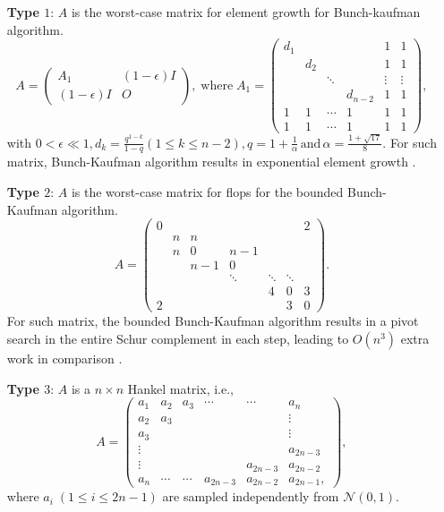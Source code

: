 \documentclass[11pt]{article}
\begin{document}
\begin{itemize}
\item[{\bf Type $1$}:] $A$ is the worst-case matrix for element growth for Bunch-kaufman algorithm.
\[ A = \left(
\begin{array}{cc}
A_1 & (1 - \epsilon) I \\
(1 - \epsilon) I & O 
\end{array}
\right), \; \mbox{where} \; A_1 = \left(
\begin{array}{cccccc}
d_1 &  &  &  & 1 & 1 \\
& d_2 &  &  & 1 & 1 \\
&  & \ddots &  & \vdots & \vdots \\
&  &  & d_{n-2} & 1 & 1 \\
1 & 1 & \cdots & 1 & 1 & 1 \\
1 & 1 & \cdots & 1 & 1 & 1 
\end{array}
\right), \]
with ${\displaystyle 0 < \epsilon \ll 1, d_k = \frac{q^{1-k}}{1-q}(1 \le k \le n-2), q = 1 + \frac{1}{\alpha} \, \mbox{and} \, \alpha = \frac{1 + \sqrt{17}}{8}}$. For such matrix, Bunch-Kaufman algorithm results in exponential element growth \cite{druinsky2011growth}. 

\item[{\bf Type $2$}:] $A$ is the worst-case matrix for flops for the bounded Bunch-Kaufman algorithm.
$$
A = \left(
\begin{array}{ccccccc}
0 &  &  &  &  &  & 2 \\
& n & n &  &  &  &  \\
& n & 0 & n-1 &  &  &  \\
&  & n-1 & 0 &  &  &  \\
&  &  & \ddots & \ddots & \ddots &  \\
&  &  &  & 4 & 0 & 3 \\
2 &  &  &  &  & 3 & 0 
\end{array}
\right).
$$
For such matrix, the bounded Bunch-Kaufman algorithm results in a pivot search in the entire Schur complement in each step, leading to $O(n^3)$ extra work in comparison \cite{ashcraft1998accurate}.

\item[{\bf Type $3$}:] $A$ is a $n \times n$ Hankel matrix, i.e.,
$$
A = \begin{pmatrix}
a_1 & a_2 & a_3 & \cdots & \cdots & a_n \\
a_2 & a_3 &  &  &  & \vdots \\
a_3 &   &  &  &  & \vdots \\
\vdots &  &  &  &   & a_{2 n - 3} \\
\vdots &  &  &  & a_{2 n - 3} & a_{2 n - 2} \\
a_n & \cdots &  \cdots & a_{2 n - 3}   & a_{2 n - 2} & a_{2 n - 1},
\end{pmatrix},
$$
where $a_i \; (1 \le i \le 2 n - 1)$ are sampled independently from $\mathcal{N}(0, 1)$.


\end{itemize}
\end{document}
